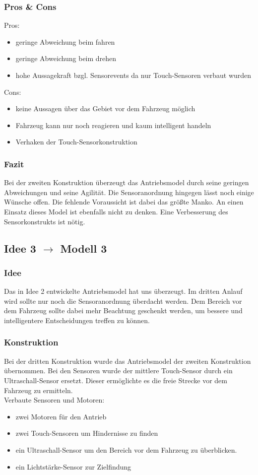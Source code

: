 \documentclass[10pt,a4paper]{scrartcl}
\begin{document}
\subsubsection{Pros \& Cons}
Pros:
\begin{itemize}
\item geringe Abweichung beim fahren
\item geringe Abweichung beim drehen
\item hohe Aussagekraft bzgl. Sensorevents da nur Touch-Sensoren verbaut wurden
\end{itemize}
Cons:
\begin{itemize}
\item keine Aussagen über das Gebiet vor dem Fahrzeug möglich
\item Fahrzeug kann nur noch reagieren und kaum intelligent handeln
\item Verhaken der Touch-Sensorkonstruktion
\end{itemize}
\subsubsection{Fazit}
Bei der zweiten Konstruktion überzeugt das Antriebsmodel durch seine geringen Abweichungen und seine Agilität. Die Sensoranordnung hingegen lässt noch einige Wünsche offen. Die fehlende Voraussicht ist dabei das größte Manko. An einen Einsatz dieses Model ist ebenfalls nicht zu denken. Eine Verbesserung des Sensorkonstrukts ist nötig.
\subsection{Idee 3 $\rightarrow$ Modell 3}%
\subsubsection{Idee}
Das in Idee 2 entwickelte Antriebsmodel hat uns überzeugt. Im dritten Anlauf wird sollte nur noch die Sensoranordnung überdacht werden. Dem Bereich vor dem Fahrzeug sollte dabei mehr Beachtung geschenkt werden, um bessere und intelligentere Entscheidungen treffen zu können.
\subsubsection{Konstruktion}
Bei der dritten Konstruktion wurde das Antriebsmodel der zweiten Konstruktion übernommen. Bei den Sensoren wurde der mittlere Touch-Sensor durch ein Ultraschall-Sensor ersetzt. Dieser ermöglichte es die freie Strecke vor dem Fahrzeug zu ermitteln.\\
Verbaute Sensoren und Motoren:
\begin{itemize}
\item zwei Motoren für den Antrieb
\item zwei Touch-Sensoren um Hindernisse zu finden
\item ein Ultraschall-Sensor um den Bereich vor dem Fahrzeug zu überblicken.
\item ein Lichtstärke-Sensor zur Zielfindung
\end{itemize}
\end{document}
